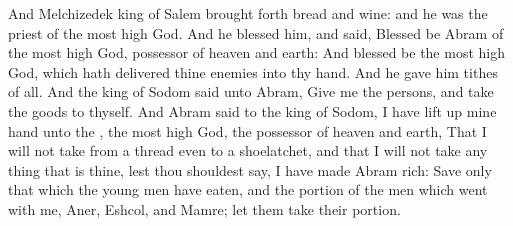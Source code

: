 \begin{biblechapter}
\verse And Melchizedek king of Salem brought forth bread and wine: and he was the priest of the most high God.
\verse And he blessed him, and said, Blessed be Abram of the most high God, possessor of heaven and earth:
\verse And blessed be the most high God, which hath delivered thine enemies into thy hand. And he gave him tithes of all.
\verse And the king of Sodom said unto Abram, Give me the persons, and take the goods to thyself.
\verse And Abram said to the king of Sodom, I have lift up mine hand unto the \LORD, the most high God, the possessor of heaven and earth,
\verse That I will not take from a thread even to a shoelatchet, and that I will not take any thing that is thine, lest thou shouldest say, I have made Abram rich:
\verse Save only that which the young men have eaten, and the portion of the men which went with me, Aner, Eshcol, and Mamre; let them take their portion.
\end{biblechapter}

